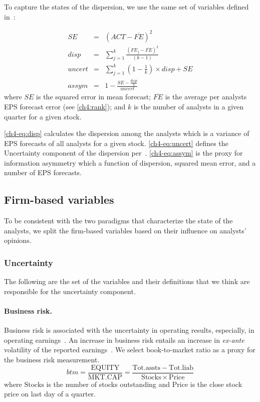 To capture the states of the dispersion, we use the same set of variables defined in~\cite[page 333]{barron2009}:

\begin{eqnarray}
SE&=&(ACT-\overline{FE})^2 \nonumber\\
disp&=&\sum_{j=1}^{k} \frac{(FE_{j}-\overline{FE})^2}{(k-1)} \label{ch4-eq:disp}\\
uncert&=&\sum_{j=1}^{k} \left(1-\frac{1}{k}\right) \times disp + SE \label{ch4-eq:uncert}\\
assym& = & 1-\frac{SE-\frac{disp}{k}}{uncert} \label{ch4-eq:assym}
\end{eqnarray}
where $SE$ is the squared error in mean forecast; $\overline{FE}$ is the average per analysts EPS forecast error (see \ref{ch4:rank});  and $k$ is the number of analysts in a given quarter for a given stock.

\ref{ch4-eq:disp} calculates the dispersion among the analysts which is a variance of EPS forecasts of all analysts for a given stock. \ref{ch4-eq:uncert} defines the Uncertainty component of the dispersion per~\cite{barron2009}. \ref{ch4-eq:assym} is the proxy for information asymmetry which a function of dispersion, squared mean error, and a number of EPS forecasts.


\subsection{Firm-based variables}

To be consistent with the two paradigms that characterize the state of the analysts, we split the firm-based variables based on their influence on analysts' opinions. 

\subsubsection{Uncertainty}

The following are the set of the variables and their definitions that we think are responsible for the uncertainty component.

\paragraph{Business risk.} Business risk is associated with the uncertainty in operating results, especially, in operating earnings~\citep{hill1980}. An increase in business risk entails an increase in \emph{ex-ante} volatility of the reported earnings~\citep{parkash1995}.  We select  book-to-market ratio  as a proxy for the business risk measurement.
\begin{equation}
btm=\frac{\mathrm{EQUITY}}{\mathrm{MKT.CAP}}=\frac{\mathrm{Tot.assts}-\mathrm{Tot.liab}}{\mathrm{Stocks}\times \mathrm{Price}}
\end{equation}
where $\mathrm{Stocks}$ is the number of stocks outstanding and $\mathrm{Price}$ is the close stock price on last day of a quarter.

